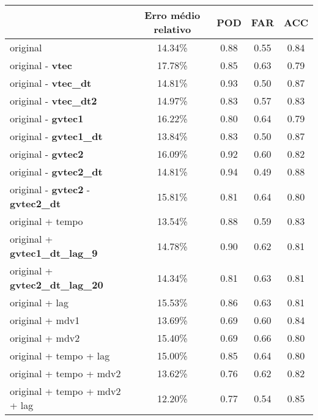 \begin{table}
\begin{center}
\begin{tabular}{|l|c|c|c|c|} 
\hline
 
	                          & Erro médio relativo	& POD	& FAR	& ACC  \\ \hline
original	                               & 14.34\%	& 0.88	& 0.55	& 0.84 \\ \hline
original - {\bf vtec}	                       & 17.78\%	& 0.85	& 0.63	& 0.79 \\ \hline
original - {\bf vtec\_dt}	               & 14.81\%	& 0.93	& 0.50	& 0.87 \\ \hline
original - {\bf vtec\_dt2}	               & 14.97\%	& 0.83	& 0.57	& 0.83 \\ \hline 
original - {\bf gvtec1}	                       & 16.22\%	& 0.80	& 0.64	& 0.79 \\ \hline
original - {\bf gvtec1\_dt}	               & 13.84\%	& 0.83	& 0.50	& 0.87 \\ \hline
original - {\bf gvtec2}	                       & 16.09\%	& 0.92	& 0.60	& 0.82 \\ \hline
original - {\bf gvtec2\_dt}	               & 14.81\%	& 0.94	& 0.49	& 0.88 \\ \hline
original - {\bf gvtec2} - {\bf gvtec2\_dt}     & 15.81\%        & 0.81  & 0.64  & 0.80 \\ \hline
original + tempo	                       & 13.54\%	& 0.88	& 0.59	& 0.83 \\ \hline
original + {\bf gvtec1\_dt\_lag\_9}            & 14.78\%	& 0.90	& 0.62	& 0.81 \\ \hline
original + {\bf gvtec2\_dt\_lag\_20}           & 14.34\%	& 0.81	& 0.63	& 0.81 \\ \hline
original + lag	                               & 15.53\%	& 0.86	& 0.63	& 0.81 \\ \hline
original + mdv1	                               & 13.69\%	& 0.69	& 0.60	& 0.84 \\ \hline
original + mdv2	                               & 15.40\%	& 0.69	& 0.66	& 0.80 \\ \hline
original + tempo + lag	                       & 15.00\%	& 0.85	& 0.64	& 0.80 \\ \hline
original + tempo + mdv2	                       & 13.62\%	& 0.76	& 0.62	& 0.82 \\ \hline
original + tempo + mdv2 + lag 	               & 12.20\%	& 0.77	& 0.54	& 0.85 \\ \hline

\end{tabular}
\end{center}
\end{table}
